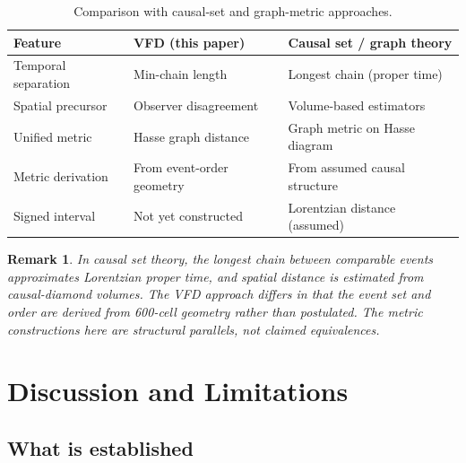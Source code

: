 \documentclass[12pt]{article}
\newtheorem{remark}[theorem]{Remark}
\begin{document}
\begin{table}[ht]
\centering
\caption{Comparison with causal-set and graph-metric approaches.}
\label{tab:comparison}
\begin{tabular}{@{}lll@{}}
\toprule
Feature & VFD (this paper) & Causal set / graph theory \\
\midrule
Temporal separation & Min-chain length & Longest chain (proper time) \\
Spatial precursor & Observer disagreement & Volume-based estimators \\
Unified metric & Hasse graph distance & Graph metric on Hasse diagram \\
Metric derivation & From event-order geometry & From assumed causal structure \\
Signed interval & Not yet constructed & Lorentzian distance (assumed) \\
\bottomrule
\end{tabular}
\end{table}

\begin{remark}
In causal set theory, the longest chain between comparable events approximates Lorentzian proper time, and spatial distance is estimated from causal-diamond volumes. The VFD approach differs in that the event set and order are \textit{derived} from 600-cell geometry rather than postulated. The metric constructions here are structural parallels, not claimed equivalences.
\end{remark}

\section{Discussion and Limitations}\label{sec:discussion}

\subsection{What is established}
\end{document}
